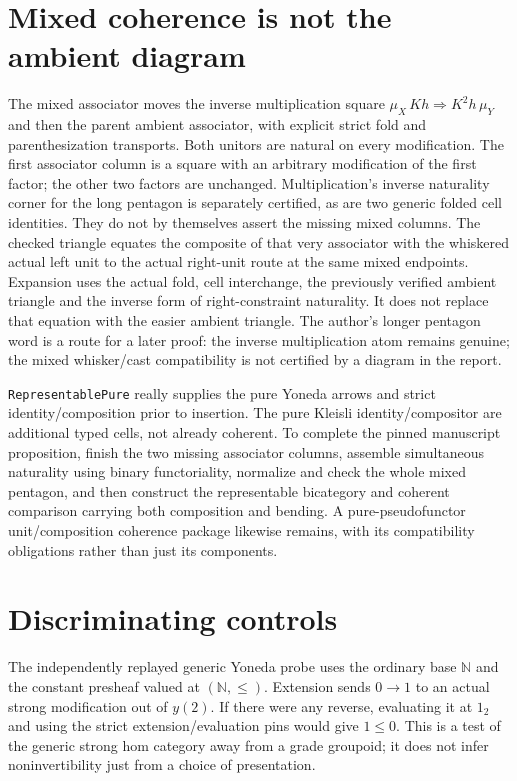 \documentclass[11pt]{article}
\newcommand{\nm}[1]{\nolinkurl{#1}}
\begin{document}
\section*{Mixed coherence is not the ambient diagram}
The mixed associator moves the inverse multiplication square
$\mu_X\,Kh \Rightarrow K^2h\,\mu_Y$ and then the parent ambient
associator, with explicit strict fold and parenthesization transports.
Both unitors are natural on every modification. The first associator
column is a square with an arbitrary modification of the first factor;
the other two factors are unchanged. Multiplication's inverse
naturality corner for the long pentagon is separately certified, as are
two generic folded cell identities. They do not by themselves assert
the missing mixed columns.
The checked triangle equates the composite of that very associator
with the whiskered actual left unit to the actual right-unit route
at the same mixed endpoints. Expansion uses the actual fold, cell
interchange, the previously verified ambient triangle and the inverse
form of right-constraint naturality. It does not replace that equation
with the easier ambient triangle. The author's longer pentagon word
is a route for a later proof: the inverse multiplication atom remains
genuine; the mixed whisker/cast compatibility is not certified by a
diagram in the report.

\nm{RepresentablePure} really supplies the pure Yoneda arrows and
strict identity/composition prior to insertion. The pure Kleisli
identity/compositor are additional typed cells, not already coherent.
To complete the pinned manuscript proposition, finish the two missing
associator columns, assemble simultaneous naturality using binary
functoriality, normalize and check the whole mixed pentagon, and then
construct the representable bicategory and coherent comparison carrying
both composition and bending. A pure-pseudofunctor unit/composition
coherence package likewise remains, with its compatibility obligations
rather than just its components.
\section*{Discriminating controls}
The independently replayed generic Yoneda probe uses the ordinary base
$\mathbb N$ and the constant presheaf valued at $(\mathbb N,\leq)$.
Extension sends $0\to1$ to an actual strong modification out of $y(2)$.
If there were any reverse, evaluating it at $1_2$ and using the strict
extension/evaluation pins would give $1\leq0$. This is a test of the
generic strong hom category away from a grade groupoid; it does not infer
noninvertibility just from a choice of presentation.
\end{document}
